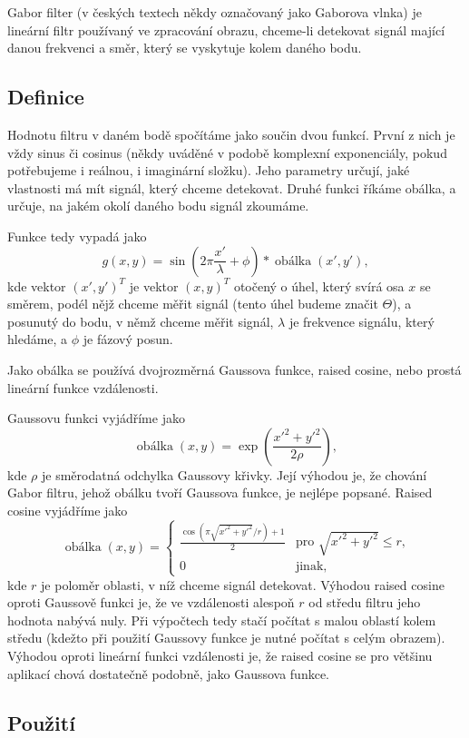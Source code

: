 Gabor filter (v českých textech někdy označovaný jako Gaborova vlnka) je
lineární filtr používaný ve zpracování obrazu, chceme-li detekovat signál
mající danou frekvenci a směr, který se vyskytuje kolem daného bodu.

\subsection{Definice}

Hodnotu filtru v daném bodě spočítáme jako součin dvou funkcí. První z nich je
vždy sinus či cosinus (někdy uváděné v podobě komplexní exponenciály, pokud
potřebujeme i reálnou, i imaginární složku). Jeho parametry určují, jaké
vlastnosti má mít signál, který chceme detekovat. Druhé funkci říkáme obálka, a
určuje, na jakém okolí daného bodu signál zkoumáme.

Funkce tedy vypadá jako $$g(x,y) =
\sin\left(2\pi\frac{x'}{\lambda}+\phi\right)*\operatorname{obálka}(x',y'),$$
kde vektor $(x',y')^T$ je vektor $(x,y)^T$ otočený o úhel, který svírá osa $x$
se směrem, podél nějž chceme měřit signál (tento úhel budeme značit $\Theta$),
a posunutý do bodu, v němž chceme měřit signál, $\lambda$ je frekvence signálu,
který hledáme, a $\phi$ je fázový posun.

Jako obálka se používá dvojrozměrná Gaussova funkce, raised cosine, nebo prostá
lineární funkce vzdálenosti. 

Gaussovu funkci vyjádříme jako $$ \operatorname{obálka}(x,y) =
\exp\left(\frac{x'^2 + y'^2}{2\rho}\right),$$ kde $\rho$ je směrodatná odchylka
Gaussovy křivky. Její výhodou je, že chování Gabor filtru, jehož obálku tvoří
Gaussova funkce, je nejlépe popsané. Raised cosine vyjádříme jako 
$$
\operatorname{obálka}(x,y)=
\begin{cases}
 \frac{\cos(\pi\sqrt{x'^2+y'^2}/r)+1}2 &\text{pro $\sqrt{x'^2+y'^2}\leq r$,}\\[1ex]
 0 &\text{jinak,}
\end{cases}
$$ kde $r$ je poloměr oblasti, v níž chceme signál detekovat. Výhodou raised
cosine oproti Gaussově funkci je, že ve vzdálenosti alespoň $r$ od středu
filtru jeho hodnota nabývá nuly. Při výpočtech tedy stačí počítat s malou
oblastí kolem středu (kdežto při použití Gaussovy funkce je nutné počítat s
celým obrazem). Výhodou oproti lineární funkci vzdálenosti je, že raised cosine
se pro většinu aplikací chová dostatečně podobně, jako Gaussova funkce.

\subsection{Použití}

